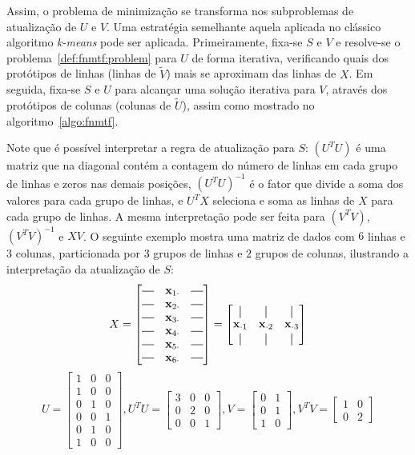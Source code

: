 \documentclass[
    12pt,                %
    oneside,            %
    a4paper,            %
    english,            %
    brazil                %
    ]{abntex2ppgsi}
\newcommand*{\horzbar}{\rule[.5ex]{2.5ex}{0.5pt}}
\newcommand*{\vertbar}{\rule[-1ex]{0.5pt}{2.5ex}}
\begin{document}
Assim, o problema de minimização se transforma nos subproblemas de atualização de $U$ e $V$.
Uma estratégia semelhante aquela aplicada no clássico algoritmo \textit{k-means} pode ser aplicada.
Primeiramente, fixa-se $S$ e $V$ e resolve-se o problema~\ref{def:fnmtf:problem} para $U$ de forma iterativa, verificando quais dos protótipos de linhas (linhas de $\widetilde{V}$) mais se aproximam das linhas de $X$.
Em seguida, fixa-se $S$ e $U$ para alcançar uma solução iterativa para $V$, através dos protótipos de colunas (colunas de $\widetilde{U}$), assim como mostrado no algoritmo~\ref{algo:fnmtf}.

Note que é possível interpretar a regra de atualização para $S$: $(U^T U)$ é uma matriz que na diagonal contém a contagem do número de linhas em cada grupo de linhas e zeros nas demais posições, $(U^T U)^{-1}$ é o fator que divide a soma dos valores para cada grupo de linhas, e $U^T X$ seleciona e soma as linhas de $X$ para cada grupo de linhas.
A mesma interpretação pode ser feita para $(V^T V)$, $(V^T V)^{-1}$ e $XV$.
O seguinte exemplo mostra uma matriz de dados com $6$ linhas e $3$ colunas, particionada por $3$ grupos de linhas e $2$ grupos de colunas, ilustrando a interpretação da atualização de $S$:
\[
X = \begin{bmatrix}
\horzbar & \mathbf{x}_{1 \cdot} & \horzbar \\
\horzbar & \mathbf{x}_{2 \cdot} & \horzbar \\
\horzbar & \mathbf{x}_{3 \cdot} & \horzbar \\
\horzbar & \mathbf{x}_{4 \cdot} & \horzbar \\
\horzbar & \mathbf{x}_{5 \cdot} & \horzbar \\
\horzbar & \mathbf{x}_{6 \cdot} & \horzbar
\end{bmatrix}
= \begin{bmatrix}
\vertbar             & \vertbar             & \vertbar             \\
\mathbf{x}_{\cdot 1} & \mathbf{x}_{\cdot 2} & \mathbf{x}_{\cdot 3} \\
\vertbar             & \vertbar             & \vertbar
\end{bmatrix}
\]
\[
U = \begin{bmatrix}
1 & 0 & 0 \\
1 & 0 & 0 \\
0 & 1 & 0 \\
0 & 0 & 1 \\
0 & 1 & 0 \\
1 & 0 & 0
\end{bmatrix},
U^T U = \begin{bmatrix}
3 & 0 & 0 \\
0 & 2 & 0 \\
0 & 0 & 1
\end{bmatrix},
V = \begin{bmatrix}
0 & 1 \\
0 & 1 \\
1 & 0
\end{bmatrix},
V^T V = \begin{bmatrix}
1 & 0 \\
0 & 2
\end{bmatrix}
\]
\end{document}
